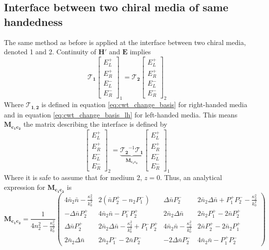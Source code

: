 \subsection{Interface between two chiral media of same handedness}
The same method as before is applied at the interface between two chiral media, denoted 1 and 2. Continuity of $\bm{H'}$ and $\bm{E}$ implies
\begin{equation}
\bm{\mathcal{T}_1}\begin{bmatrix}
E_L^+\\E_R^+\\E_L^-\\E_R^-
\end{bmatrix}_1 = \bm{\mathcal{T}_2}\begin{bmatrix}
E_L^+\\E_R^+\\E_L^-\\E_R^-
\end{bmatrix}_2
\end{equation}
Where $\bm{\mathcal{T}_{1,2}}$ is defined in equation \ref{eq:cwt_change_basis} for right-handed media and in equation \ref{eq:cwt_change_basis_lh} for left-handed media. This means $\bm{M_{c_1c_2}}$ the matrix describing the interface is defined by
\begin{equation}
\begin{bmatrix}
E_L^+\\E_R^+\\E_L^-\\E_R^-
\end{bmatrix}_2 = \underbrace{\bm{\mathcal{T}_2}^{-1}\bm{\mathcal{T}_1}}_{\bm{M_{c_1c_2}}}\begin{bmatrix}
E_L^+\\E_R^+\\E_L^-\\E_R^-
\end{bmatrix}_1
\end{equation}
%
Where it is safe to assume that for medium 2, $z=0$. Thus, an analytical expression for $\bm{M_{c_1c_2}}$ is
\begin{equation}
\bm{M_{c_1c_2}} = \frac{1}{4n_2^2-\frac{\kappa_2^2}{k_0^2}}\begin{pmatrix}
4\bar{n}_2\bar{n}-\frac{\kappa_2^2}{k_0^2} & 2\left(\bar{n}P_2^+-n_2P_1^-\right) & \Delta\bar{n} P_2^- & 2\bar{n}_2\Delta\bar{n}+P_1^+P_2^--\frac{\kappa_2^2}{k_0^2}\\
-\Delta\bar{n}P_2^+ & 4\bar{n}_2\bar{n}-P_1^-P_2^+ & 2\bar{n}_2\Delta\bar{n} & 2\bar{n}_2P_1^+ - 2\bar{n}P_2^+ \\
\Delta\bar{n}P_2^+ & 2\bar{n}_2\Delta\bar{n}-\frac{\kappa_2^2}{k_0^2} + P_1^-P_2^+ & 4\bar{n}_2\bar{n}-\frac{\kappa_2^2}{k_0^2} & 2\bar{n}P_2^+-2\bar{n}_2P_1^+\\
2\bar{n}_2\Delta\bar{n} & 2\bar{n}_2P_1^- - 2\bar{n}P_2^- & -2\Delta\bar{n}P_2^- & 4\bar{n}_2\bar{n}-P_1^+P_2^-
\end{pmatrix}
\end{equation}
